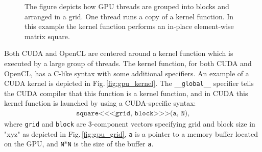 \begin{figure}[t!]
\centering
{}
\caption{The figure depicts how GPU threads are grouped into blocks and arranged in a grid. One thread runs a copy of a kernel function. In this example the kernel function performs an in-place element-wise matrix square.}
\label{fig:gpu_grid_kernel}
\end{figure}

Both CUDA and OpenCL are centered around a kernel function which is executed by a large group of threads. The kernel function, for both CUDA and OpenCL, has a C-like syntax with some additional specifiers. An example of a CUDA kernel is depicted in Fig.\,\ref{fig:gpu_kernel}. The \texttt{\_\_global\_\_} specifier tells the CUDA compiler that this function is a kernel function, and in CUDA this kernel function is launched by using a CUDA-specific syntax:
\begin{align*}
\texttt{square<<<grid, block>>>(a, N)},
\end{align*}
where \texttt{grid} and \texttt{block} are 3-component vectors specifying grid and block size in "xyz" as depicted in Fig.\,\ref{fig:gpu_grid}, \texttt{a} is a pointer to a memory buffer located on the GPU, and \texttt{N}$*$\texttt{N} is the size of the buffer \texttt{a}. 

